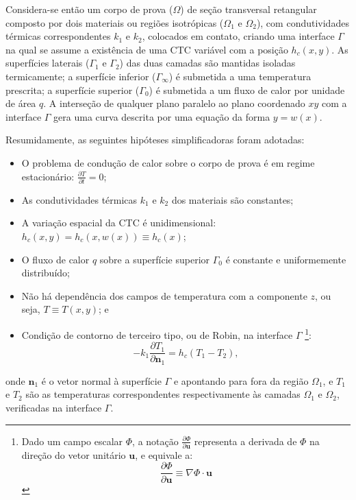 Considera-se então um corpo de prova ($\Omega$) de seção transversal retangular composto por dois materiais ou regiões isotrópicas ($\Omega_1$ e $\Omega_2$), com
condutividades térmicas correspondentes $k_1$  e $k_2$, colocados em contato,
criando uma interface $\Gamma$ na qual se assume a existência de uma CTC variável com a posição $h_c(x, y)$.
As superfícies laterais ($\Gamma_1$ e $\Gamma_2$) das duas camadas são mantidas isoladas termicamente;
a superfície inferior ($\Gamma_\infty$) é submetida a uma temperatura prescrita; a superfície superior ($\Gamma_0$) é submetida
a um fluxo de calor por unidade de área $q$. A interseção de qualquer plano paralelo ao plano coordenado $xy$ com a interface $\Gamma$ gera uma
curva descrita por uma equação da forma $y = w(x)$.

Resumidamente, as seguintes hipóteses simplificadoras foram adotadas:
\begin{itemize}
  \item O problema de condução de calor sobre o corpo de prova é em regime estacionário: $\displaystyle\frac{\partial T}{\partial t} = 0$;
  \item As condutividades térmicas $k_1$ e $k_2$ dos materiais são constantes;
  \item A variação espacial da CTC é unidimensional: $h_c(x, y) = h_c(x, w(x)) \equiv h_c(x)$;
  \item O fluxo de calor $q$ sobre a superfície superior $\Gamma_0$ é constante e uniformemente distribuído;
  \item Não há dependência dos campos de temperatura com a componente $z$, ou seja, $T \equiv T(x, y)$; e
  \item Condição de contorno de terceiro tipo, ou de Robin, na interface $\Gamma$
  \footnote{
  	Dado um campo escalar $\Phi$, a notação $\frac{\partial \Phi}{\partial \mathbf{u}}$ representa a derivada de $\Phi$ na direção do vetor unitário $\mathbf{u}$, e equivale a: 
  	\begin{equation*}
  	\frac{\partial \Phi}{\partial \mathbf{u}} \equiv \nabla \Phi \cdot \mathbf{u}
  	\end{equation*}
  	}:
  		\begin{equation*}
  			-k_1\frac{\partial T_1}{\partial \mathbf{n}_1} = h_c(T_1 - T_2),
  		\end{equation*}   
\end{itemize} 
onde
$\mathbf{n}_1$ é o vetor normal à superfície $\Gamma$ e apontando para fora da região $\Omega_1$, e $T_1$ e $T_2$ são as temperaturas
correspondentes respectivamente às camadas $\Omega_1$ e $\Omega_2$, verificadas na interface $\Gamma$.

